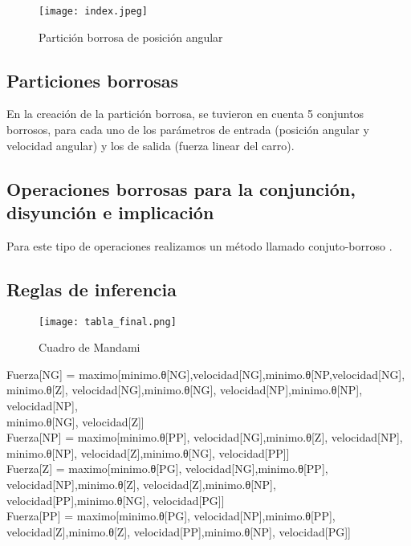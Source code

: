 \documentclass{article}
\begin{document}
\begin{figure}[ht]
    \centering
    \texttt{[image: index.jpeg]}
    \caption{Partición borrosa de posición angular}
    \label{fig:TP2_ej2b}
\end{figure}



\subsection{Particiones borrosas}

En la creación de la partición borrosa, se tuvieron en cuenta 5 conjuntos borrosos, para cada uno de los parámetros de entrada (posición angular y velocidad angular) y los de salida (fuerza linear del carro).

\subsection{Operaciones borrosas para la conjunción, disyunción e implicación}

Para este tipo de operaciones realizamos un método llamado conjuto-borroso .

\subsection{Reglas de inferencia}

\begin{figure}[ht]
    \centering
    \texttt{[image: tabla\_final.png]}
    \caption{Cuadro de Mandami}
    \label{fig:tabla_final}
\end{figure}

Fuerza[NG] = maximo[minimo.θ[NG],velocidad[NG],minimo.θ[NP,velocidad[NG],\\minimo.θ[Z], velocidad[NG],minimo.θ[NG], velocidad[NP],minimo.θ[NP], velocidad[NP],\\minimo.θ[NG], velocidad[Z]]\\

Fuerza[NP] = maximo[minimo.θ[PP], velocidad[NG],minimo.θ[Z], velocidad[NP],\\minimo.θ[NP], velocidad[Z],minimo.θ[NG], velocidad[PP]]\\

Fuerza[Z] = maximo[minimo.θ[PG], velocidad[NG],minimo.θ[PP], velocidad[NP],minimo.θ[Z], velocidad[Z],minimo.θ[NP], velocidad[PP],minimo.θ[NG], velocidad[PG]]\\

Fuerza[PP] = maximo[minimo.θ[PG], velocidad[NP],minimo.θ[PP], velocidad[Z],minimo.θ[Z], velocidad[PP],minimo.θ[NP], velocidad[PG]]\\
\end{document}
